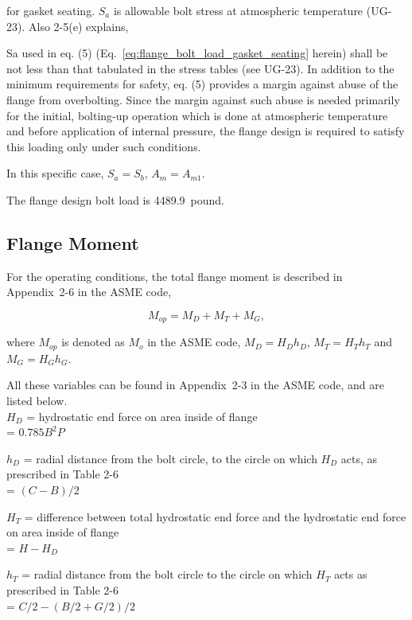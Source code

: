 for gasket seating.
$S_a$ is allowable bolt stress at atmospheric temperature (UG-23).
Also 2-5(e) explains,

\begin{displayquote}
    Sa used in eq. (5) (Eq.~\ref{eq:flange_bolt_load_gasket_seating} herein) 
    shall be not less than that tabulated in the stress tables (see UG-23). 
    In addition to the minimum requirements for safety, eq. (5) provides 
    a margin against abuse of the flange from overbolting. 
    Since the margin against such abuse is needed primarily for the initial, 
    bolting‐up operation which is done at atmospheric temperature and before 
    application of internal pressure, the flange design is required to satisfy 
    this loading only under such conditions.
\end{displayquote}

In this specific case, $S_a = S_b$, $A_m = A_{m1}$.

The flange design bolt load is 4489.9~pound.

\subsection{Flange Moment}
\label{app:flange_moment}

For the operating conditions, the total flange moment is described
in Appendix~2-6 in the ASME code,

\begin{equation}
    M_{op} = M_D+M_T+M_G,
\end{equation}

where $M_{op}$ is denoted as $M_o$ in the ASME code,
$M_D = H_Dh_D$, $M_T = H_Th_T$ and $M_G = H_Gh_G$.

All these variables can be found in Appendix~2-3 in the ASME code,
and are listed below.\\

$H_D$ = hydrostatic end force on area inside of flange \\
= $0.785B^2P$

$h_D$ = radial distance from the bolt circle, to the circle on which 
$H_D$ acts, as prescribed in Table 2-6 \\
= $(C-B)/2$

$H_T$ = difference between total hydrostatic end force and the hydrostatic 
end force on area inside of flange \\
= $H - H_D$

$h_T$ = radial distance from the bolt circle to the circle on which 
$H_T$ acts as prescribed in Table 2-6 \\ 
= $C/2 - (B/2+G/2)/2$


